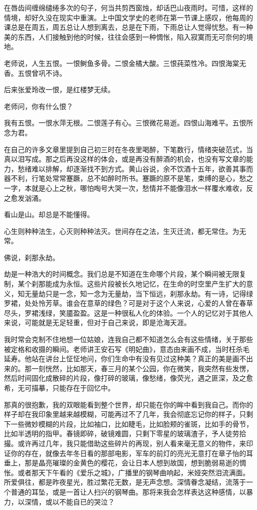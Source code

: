 \documentclass[openany,scheme = chinese, linespread = 1.5]{ctexbook}
\begin{document}
在唇齿间缠绵缱绻多次的句子，何当共剪西窗烛，却话巴山夜雨时。可惜，这样的情境，却好久没在现实中重演。上中国文学史的老师在第一节课上感叹，他每周的课总是在周五，周五总让人想到离去，总是在下雨，下雨总让人觉得忧愁。有一种美的东西，人们接触到他的时候，往往会感到一种惆怅，陷入寂寞而无可奈何的境地。

老师说，人生五恨。一恨鲥鱼多骨。二恨金橘大酸。三恨莼菜性冷。四恨海棠无香。五恨曾巩不诗。

后来张爱玲改一恨，是红楼梦无续。

老师问，你有什么恨？

我有五恨。一恨水萍无根。二恨莲子有心。三恨微花易逝。四恨山海难平。五恨所念为君。

在自己的许多文章里提到自己初三时在冬夜里喝醉，下笔数行，情绪突破范式，当真以泪写成。那之后再没这样的体会，或是再没有醉酒的机会，也没有写文章的能力，愁绪难以排解，却逐渐找不到方式。黄山谷说，余不饮酒十五年，欲善其事而器不利，行笔处常常蹇蹶，总不如醉时所书。蹇蹶的原不是笔，束缚的是心，愁之一字，本就是心上之秋，哪怕啕号大哭一次，愁情并不能像泪水一样覆水难收，反之愈发汹涌。

看山是山。却总是不能懂得。

心生则种种法生，心灭则种种法灭。世间存在之法，生灭迁流，都无常住。为无常。

佛说，刹那永劫。

劫是一种浩大的时间概念。我们总是不知道在生命哪个片段，某个瞬间被无限复制，某个刹那能成为永恒。这些片段被长久地记忆，在生命的时空里产生扩大的意义，知无量劫只是一念，知一念为无量劫，当下恒远，刹那永劫。有一诗，记得绿罗裙，处处怜芳草。谁会在意草的绿色？可是对于这个人来说，心爱的人曾在春草尽头，罗裙浅绿，笑靥盈盈。这是一种很私人化的体验。一个人的记忆对于其他人来说，可能就是无足轻重，但对于自己来说，即是沧海天涯。

我时常会克制不住地想一位姑娘，连我自己都不知道怎么会有这些情绪，关于那些被定格和收摄的瞬间。老师讲王安石写《明妃曲》，意态由来画不成，当时枉杀毛延寿。他站在讲台上怔怔地问，你们生命中有没有见过这种美？真正的美是画不出来的。那一刻恍然，比如那天，春三月的某个公园，你在微笑，我突然有些发愣，然后时间固化成散碎的片段，像打碎的玻璃，像愁绪，像荧光，遇之匪深，及之愈希，无可描摹，只能存在于回忆中。

那真的很抱歉，我的双眼能看到整个世界，却只能在你的眸中看到我自己。而你的样子却在我印象里越来越模糊，可能再过不了几年，我会彻底忘记你的样子，只剩下一些微妙模糊的片段，比如袖口，比如睫毛，比如脸颊的雀斑，比如手的骨节，比如半透明的指甲。春镜即碎，破镜难圆，只剩下零星的玻璃渣子，予人徒劳拾撮。或许再过几年，我只能借助这些碎片的再现，别人看来毫无意义的物件，来印证你的存在，就像去年冬日看的那部电影，军车的前灯的亮光无意打在章子怡的耳垂上，那是晶亮璀璨的金黄色的樱花，会让日本人想到故国，想到脆弱易逝的惆怅。或者那天下午看的《爱乐之城》，广播里的钢琴曲响起，米娅突然泪流满面。所爱俱往，都是昨夜星光，胜过繁花无数，是无声念想。深情眷念凝结，流落于一个普通的耳坠，或是一首让人扫兴的钢琴曲。那将来我会怎样表达这种感情，以暴力，以深情，或以不能自已的哭泣？
\end{document}
